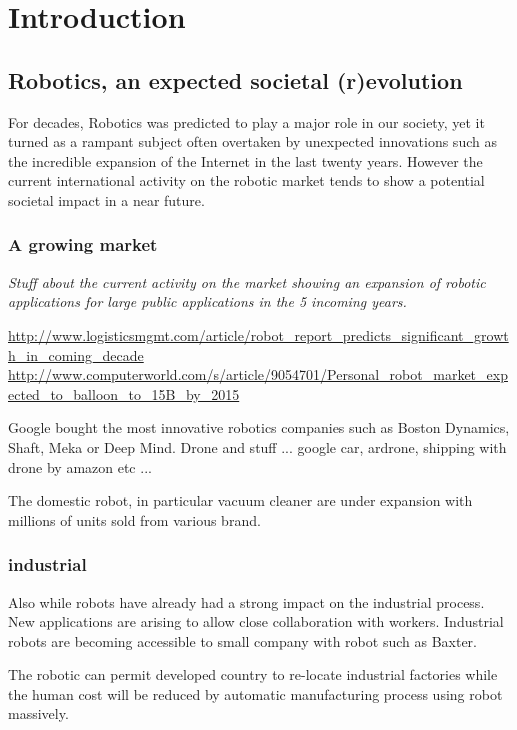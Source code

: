 
\chapter{Introduction} %


\section{Robotics, an expected societal (r)evolution} %

For decades, Robotics was predicted to play a major role in our society, yet it turned as a rampant subject often overtaken by unexpected innovations such as the incredible expansion of the Internet in the last twenty years. However the current international activity on the robotic market tends to show a potential societal impact in a near future.

\subsection{A growing market} %

\emph{Stuff about the current activity on the market showing an expansion of robotic applications for large public applications in the 5 incoming years.}

\url{http://www.logisticsmgmt.com/article/robot_report_predicts_significant_growth_in_coming_decade}
\url{http://www.computerworld.com/s/article/9054701/Personal_robot_market_expected_to_balloon_to_15B_by_2015}

Google bought the most innovative robotics companies such as Boston Dynamics, Shaft, Meka or Deep Mind.
Drone and stuff ... google car, ardrone, shipping with drone by amazon etc ...

The domestic robot, in particular vacuum cleaner are under expansion with millions of units sold from various brand.

\subsection{industrial} %
Also while robots have already had a strong impact on the industrial process. New applications are arising to allow close collaboration with workers.
Industrial robots are becoming accessible to small company with robot such as Baxter.

The robotic can permit developed country to re-locate industrial factories while the human cost will be reduced by automatic manufacturing process using robot massively.


